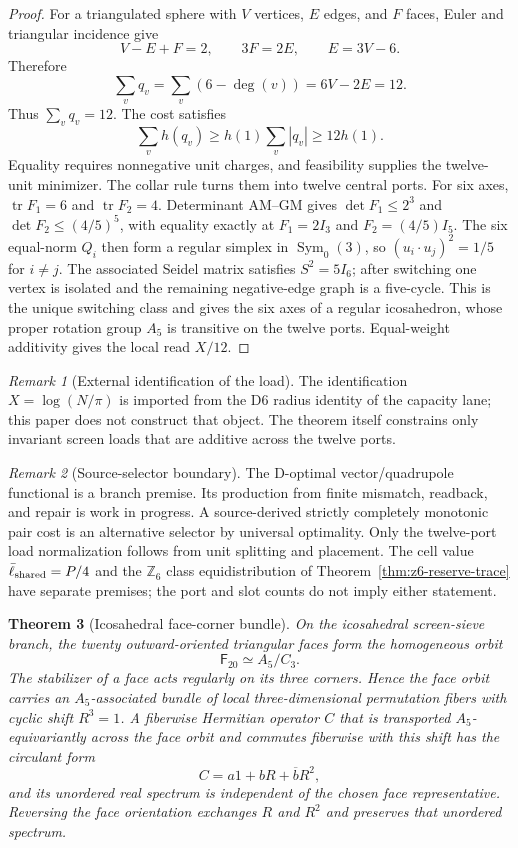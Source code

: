 \documentclass[11pt]{article}
\newtheorem{theorem}{Theorem}[section]
\theoremstyle{remark}
\newtheorem{remark}[theorem]{Remark}
\theoremstyle{plain}
\begin{document}
\begin{proof}
For a triangulated sphere with \(V\) vertices, \(E\) edges, and \(F\) faces,
Euler and triangular incidence give
\[
V-E+F=2,\qquad 3F=2E,\qquad E=3V-6.
\]
Therefore
\[
\sum_v q_v
=
\sum_v(6-\deg(v))
=6V-2E
=12.
\]
Thus \(\sum_vq_v=12\). The cost satisfies
\[
 \sum_vh(q_v)\ge h(1)\sum_v|q_v|\ge12h(1).
\]
Equality requires nonnegative unit charges, and feasibility supplies the
twelve-unit minimizer. The collar rule turns them into twelve central ports.
For six axes, \(\operatorname{tr}F_1=6\) and
\(\operatorname{tr}F_2=4\). Determinant AM--GM gives
\(\det F_1\le2^3\) and \(\det F_2\le(4/5)^5\), with equality exactly at
\(F_1=2I_3\) and \(F_2=(4/5)I_5\). The six equal-norm \(Q_i\) then form a
regular simplex in \(\operatorname{Sym}_0(3)\), so
\((u_i\cdot u_j)^2=1/5\) for \(i\ne j\). The associated Seidel matrix satisfies
\(S^2=5I_6\); after switching one vertex is isolated and the remaining
negative-edge graph is a five-cycle. This is the unique switching class and
gives the six axes of a regular icosahedron, whose proper
rotation group \(A_5\) is transitive on the twelve ports. Equal-weight
additivity gives the local read \(X/12\).
\end{proof}

\begin{remark}[External identification of the load]
The identification \(X=\log(N/\pi)\) is imported from the D6 radius identity
of the capacity lane; this paper does not construct that object. The theorem
itself constrains only invariant screen loads that are additive across the
twelve ports.
\end{remark}

\begin{remark}[Source-selector boundary]
The D-optimal vector/quadrupole functional is a branch premise. Its production
from finite mismatch, readback, and repair is work in progress. A
source-derived strictly completely monotonic pair cost is an alternative
selector by universal optimality. Only the twelve-port load normalization
follows from unit splitting and placement. The cell value
\(\bar\ell_{\rm shared}=P/4\) and the \(\mathbb Z_6\) class equidistribution of
Theorem~\ref{thm:z6-reserve-trace} have separate premises; the port and slot
counts do not imply either statement.
\end{remark}

\begin{theorem}[Icosahedral face-corner bundle]
\label{thm:icosahedral-face-corner-bundle}
On the icosahedral screen-sieve branch, the twenty outward-oriented triangular
faces form the homogeneous orbit
\[
\mathsf F_{20}\simeq A_5/C_3.
\]
The stabilizer of a face acts regularly on its three corners.  Hence the face
orbit carries an \(A_5\)-associated bundle of local three-dimensional
permutation fibers with cyclic shift \(R^3=1\).  A fiberwise Hermitian operator
\(C\) that is transported \(A_5\)-equivariantly across the face orbit and
commutes fiberwise with this shift has the circulant form
\[
C=a1+bR+\overline bR^2,
\]
and its unordered real spectrum is independent of the chosen face
representative.  Reversing the face orientation exchanges \(R\) and \(R^2\)
and preserves that unordered spectrum.
\end{theorem}
\end{document}
